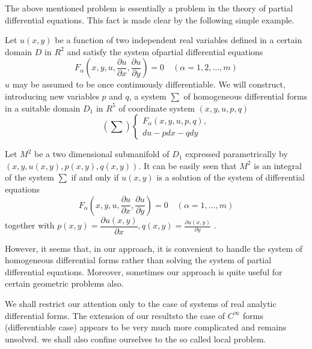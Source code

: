 The above mentioned problem is essentially a problem in the theory of
partial differential equations. This fact is made  clear by the
following simple example. 

Let $u(x, y)$ be a function of two independent real variables defined
in a certain domain $D$ in $R^2$ and satisfy the system of\pageoriginale partial
differential equations 
$$
F_\alpha \left(x,  y,  u,  \frac{\partial u}{\partial x},  \frac{\partial
  u}{ \partial y}\right) = 0 \quad (\alpha = 1,  2,  \ldots,  m) 
$$
$u$ may be assumed to be once continuously differentiable. We will
construct,  introducing new variables $p$ and $q$,  a system $\sum$ of
homogeneous differential forms in a suitable domain $D_1$ in $R^5$ of
coordinate system $(x,  y,  u,  p,  q)$ 
$$
\left(\sum\right)
\begin{cases}
  F_\alpha (x,  y,  u,  p,  q), \\
  du - pdx - qdy
\end{cases}
$$

Let $M^2$ be a two dimensional submanifold of $D_1$ expressed
parametrically by $(x,  y,  u(x,  y),  p(x,  y),  q(x,  y))$. It can
be easily seen that $M^2$ is an integral of the system $\sum$ if and
only if $u(x,  y)$ is a solution of the system of differential
equations 
$$
F_\alpha \left(x,  y,  u,  \frac{\partial u}{\partial x},  \frac{\partial
  u}{\partial y}\right) = 0 \quad (\alpha = 1,  \ldots,  m) 
$$
together with $p(x, y) = \dfrac{\partial u(x, y)}{\partial x},  q(x,
y) = \frac{\partial u(x, y)}{\partial y}$ . 

However,  it seems that,  in our approach,  it is convenient to handle
the system of homogeneous differential forms rather than solving the
system of partial differential equations. Moreover,  sometimes our
approach is quite useful for certain geometric problems also. 

We shall restrict our attention only to the case of systems of real
analytic differential forms. The extension of our results\pageoriginale to the case
of $C^\infty$ forms (differentiable case) appears to be very much more
complicated and remains unsolved. we shall also confine ourselves to
the so called local problem. 
